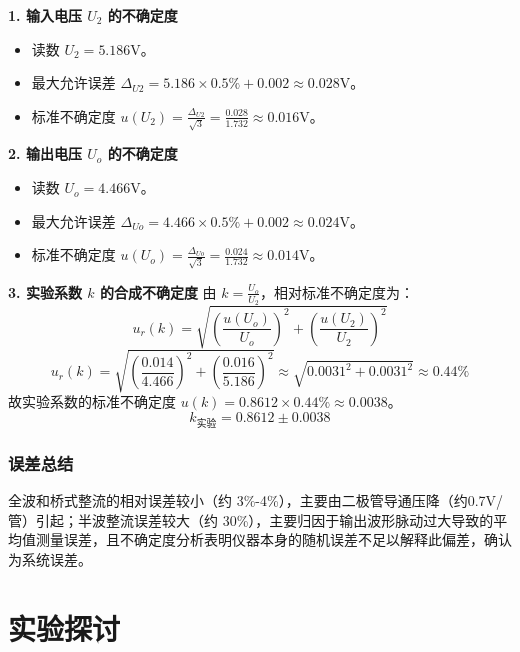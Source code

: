 \documentclass[]{../../templates/Report}%
\begin{document}
\begin{fullreportonly}
\textbf{1. 输入电压 $U_2$ 的不确定度}
\begin{itemize}
    \item 读数 $U_2 = 5.186\text{V}$。
    \item 最大允许误差 $\Delta_{U2} = 5.186 \times 0.5\% + 0.002 \approx 0.028\text{V}$。
    \item 标准不确定度 $u(U_2) = \frac{\Delta_{U2}}{\sqrt{3}} = \frac{0.028}{1.732} \approx 0.016\text{V}$。
\end{itemize}

\textbf{2. 输出电压 $U_o$ 的不确定度}
\begin{itemize}
    \item 读数 $U_o = 4.466\text{V}$。
    \item 最大允许误差 $\Delta_{Uo} = 4.466 \times 0.5\% + 0.002 \approx 0.024\text{V}$。
    \item 标准不确定度 $u(U_o) = \frac{\Delta_{Uo}}{\sqrt{3}} = \frac{0.024}{1.732} \approx 0.014\text{V}$。
\end{itemize}

\textbf{3. 实验系数 $k$ 的合成不确定度}
由 $k = \frac{U_o}{U_2}$，相对标准不确定度为：
$$ u_r(k) = \sqrt{\left(\frac{u(U_o)}{U_o}\right)^2 + \left(\frac{u(U_2)}{U_2}\right)^2} $$
$$ u_r(k) = \sqrt{\left(\frac{0.014}{4.466}\right)^2 + \left(\frac{0.016}{5.186}\right)^2} \approx \sqrt{0.0031^2 + 0.0031^2} \approx 0.44\% $$
故实验系数的标准不确定度 $u(k) = 0.8612 \times 0.44\% \approx 0.0038$。
$$ k_{\text{实验}} = 0.8612 \pm 0.0038 $$

\subsubsection{误差总结}
全波和桥式整流的相对误差较小（约 3\%-4\%），主要由二极管导通压降（约0.7V/管）引起；半波整流误差较大（约 30\%），主要归因于输出波形脉动过大导致的平均值测量误差，且不确定度分析表明仪器本身的随机误差不足以解释此偏差，确认为系统误差。


\section{实验探讨}


\end{fullreportonly}
\end{document}
